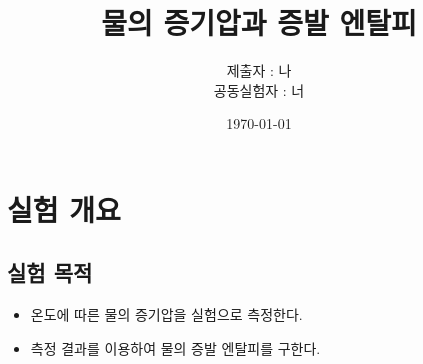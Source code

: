 \documentclass[a4paper,10pt]{article}
\begin{document}
	\title{물의 증기압과 증발 엔탈피}	
	\author{제출자 : 나\\공동실험자 : 너}
	\date{\today}
	\maketitle
	\section{실험 개요}
	
	\subsection{실험 목적}
	\begin{itemize}
		\item 온도에 따른 물의 증기압을 실험으로 측정한다.
		\item 측정 결과를 이용하여 물의 증발 엔탈피를 구한다.
	\end{itemize}
	
\end{document}
